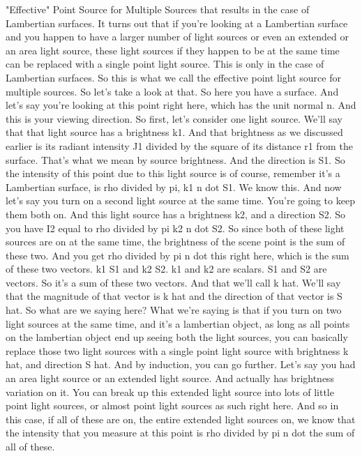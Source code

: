 \documentclass[12pt]{article}
\begin{document}
"Effective" Point Source for Multiple Sources
that results in the case of Lambertian surfaces.
It turns out that if you're looking at a Lambertian surface
and you happen to have a larger number of light sources
or even an extended or an area light source,
these light sources if they happen to be at the same time
can be replaced with a single point light source.
This is only in the case of Lambertian surfaces.
So this is what we call the effective point light
source for multiple sources.
So let's take a look at that.
So here you have a surface.
And let's say you're looking at this point
right here, which has the unit normal n.
And this is your viewing direction.
So first, let's consider one light source.
We'll say that that light source has a brightness k1.
And that brightness as we discussed
earlier is its radiant intensity J1 divided
by the square of its distance r1 from the surface.
That's what we mean by source brightness.
And the direction is S1.
So the intensity of this point due to this light source
is of course, remember it's a Lambertian surface,
is rho divided by pi, k1 n dot S1.
We know this.
And now let's say you turn on a second light source
at the same time.
You're going to keep them both on.
And this light source has a brightness k2, and a direction
S2.
So you have I2 equal to rho divided by pi k2 n dot S2.
So since both of these light sources
are on at the same time, the brightness of the scene point
is the sum of these two.
And you get rho divided by pi n dot this right here,
which is the sum of these two vectors.
k1 S1 and k2 S2.
k1 and k2 are scalars.
S1 and S2 are vectors.
So it's a sum of these two vectors.
And that we'll call k hat.
We'll say that the magnitude of that vector is k hat
and the direction of that vector is S hat.
So what are we saying here?
What we're saying is that if you turn
on two light sources at the same time,
and it's a lambertian object, as long as all points
on the lambertian object end up seeing both the light sources,
you can basically replace those two light sources
with a single point light source with brightness k
hat, and direction S hat.
And by induction, you can go further.
Let's say you had an area light source or an extended
light source.
And actually has brightness variation on it.
You can break up this extended light source
into lots of little point light sources,
or almost point light sources as such right here.
And so in this case, if all of these are on,
the entire extended light sources
on, we know that the intensity that you measure at this point
is rho divided by pi n dot the sum of all of these.
\end{document}
